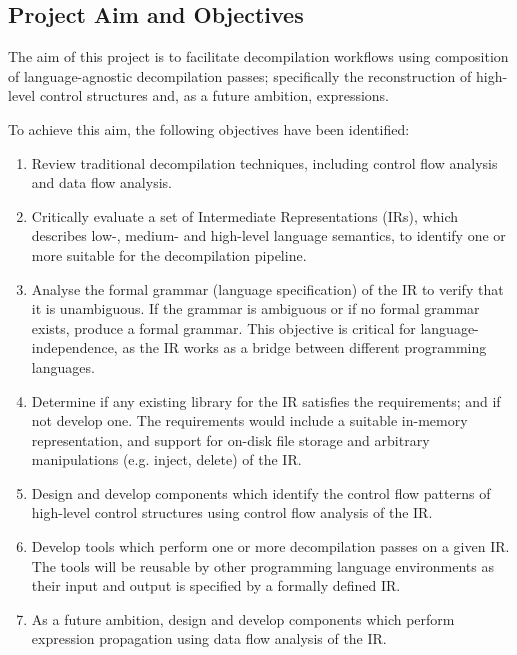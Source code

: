
\subsection{Project Aim and Objectives}
\label{sec:intro_project_aim_and_objectives}

The aim of this project is to facilitate decompilation workflows using composition of language-agnostic decompilation passes; specifically the reconstruction of high-level control structures and, as a future ambition, expressions.

To achieve this aim, the following objectives have been identified:
\begin{enumerate}
	\item Review traditional decompilation techniques, including control flow analysis and data flow analysis.
	\label{itm:obj_review_decomp_techniques}
	\item Critically evaluate a set of Intermediate Representations (IRs), which describes low-, medium- and high-level language semantics, to identify one or more suitable for the decompilation pipeline.
	\label{itm:obj_review_suitable_ir}
	\item Analyse the formal grammar (language specification) of the IR to verify that it is unambiguous. If the grammar is ambiguous or if no formal grammar exists, produce a formal grammar. This objective is critical for language-independence, as the IR works as a bridge between different programming languages.
	\label{itm:obj_formal_ir}
	\item Determine if any existing library for the IR satisfies the requirements; and if not develop one. The requirements would include a suitable in-memory representation, and support for on-disk file storage and arbitrary manipulations (e.g. inject, delete) of the IR.
	\label{itm:obj_ir_library}
	\item Design and develop components which identify the control flow patterns of high-level control structures using control flow analysis of the IR.
	\label{itm:obj_control_flow_analysis_component}
	\item Develop tools which perform one or more decompilation passes on a given IR. The tools will be reusable by other programming language environments as their input and output is specified by a formally defined IR.
	\label{itm:obj_decomp_pass_tool}
	\item As a future ambition, design and develop components which perform expression propagation using data flow analysis of the IR.
	\label{itm:obj_data_analysis_library}
\end{enumerate}
